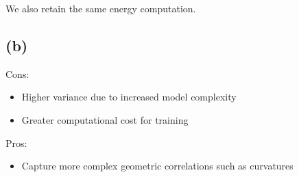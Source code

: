 \documentclass[11pt]{amsart}
\begin{document}
We also retain the same energy computation.

\subsection{(b)}

Cons:
\begin{itemize}
	\item Higher variance due to increased model complexity
	\item Greater computational cost for training
\end{itemize}
Pros:
\begin{itemize}
	\item Capture more complex geometric correlations such as curvatures 
\end{itemize}



\end{document}
